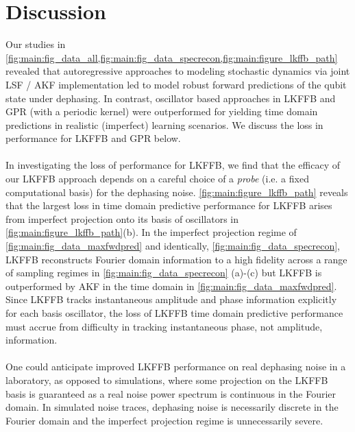 \section{Discussion} \label{sec:main:discussion}


Our studies in  \cref{fig:main:fig_data_all,fig:main:fig_data_specrecon,fig:main:figure_lkffb_path} revealed that autoregressive approaches to modeling stochastic dynamics via joint LSF / AKF implementation led to model robust forward predictions of the qubit state under dephasing. In contrast, oscillator based approaches in LKFFB and GPR (with a periodic kernel) were outperformed for yielding time domain predictions in realistic (imperfect) learning scenarios. We discuss the loss in performance for LKFFB and GPR below. 
\\
\\
In investigating the loss of performance for LKFFB, we find that the efficacy of our LKFFB approach depends on a careful choice of a \textit{probe} (i.e. a fixed computational basis) for the dephasing noise. \cref{fig:main:figure_lkffb_path} reveals that the largest loss in time domain predictive performance for LKFFB arises from imperfect projection onto its basis of oscillators in \cref{fig:main:figure_lkffb_path}(b). In the imperfect projection regime of \cref{fig:main:fig_data_maxfwdpred} and identically, \cref{fig:main:fig_data_specrecon}, LKFFB reconstructs Fourier domain information to a high fidelity across a range of sampling regimes in \cref{fig:main:fig_data_specrecon} (a)-(c) but LKFFB is outperformed by AKF in the time domain in \cref{fig:main:fig_data_maxfwdpred}. Since LKFFB tracks instantaneous amplitude and phase information explicitly for each basis oscillator, the loss of LKFFB time domain predictive performance must accrue from difficulty in tracking instantaneous phase, not amplitude, information. 
\\
\\
One could anticipate improved LKFFB performance on real dephasing noise in a laboratory, as opposed to simulations, where some projection on the LKFFB basis is guaranteed as a real noise power spectrum is continuous in the Fourier domain.  In simulated noise traces, dephasing noise is necessarily discrete in the Fourier domain and the imperfect projection regime is unnecessarily severe.
\\
